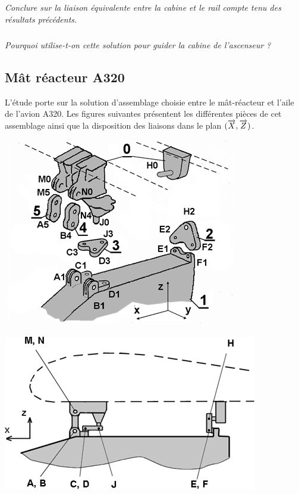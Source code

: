 \documentclass[10pt,fleqn]{article} %
\begin{document}
\begin{multicols}{2}
\begin{multicols}{2}
\subparagraph{}\textit{Conclure sur la liaison équivalente entre la cabine et le rail compte tenu des résultats précédents.}

\subparagraph{}\textit{Pourquoi utilise-t-on cette solution pour guider la cabine de l'ascenseur ?}




\subsection*{Mât réacteur A320}
\setcounter{exo}{0}
 L’étude porte sur la solution d’assemblage choisie entre le mât-réacteur et l’aile de l’avion A320. Les figures suivantes présentent les différentes pièces de cet assemblage ainsi que la disposition des liaisons dans le plan $(\overrightarrow{X}, \overrightarrow{Z})$.
 
 
\begin{center}
\includegraphics[width=.95\linewidth]{images/fig_05}
\end{center}

\begin{center}
\includegraphics[width=.95\linewidth]{images/fig_06}
\end{center}


\end{multicols}
\end{multicols}
\end{document}
